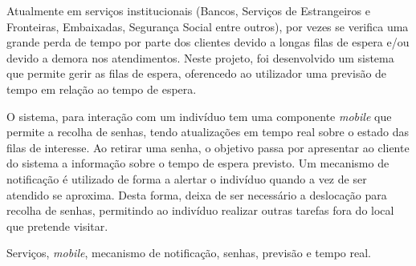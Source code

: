 \abstractPT  %

Atualmente em serviços institucionais (Bancos, Serviços de Estrangeiros e Fronteiras, Embaixadas, Segurança Social entre outros), por vezes se verifica uma grande perda de tempo por parte dos clientes devido a longas filas de espera e/ou devido a demora nos atendimentos.
Neste projeto, foi desenvolvido um sistema que permite gerir as filas de espera, oferencedo ao utilizador uma previsão de tempo em relação ao tempo de espera.

O sistema, para interação com um indivíduo tem uma componente \textit{mobile} que permite a recolha de senhas, tendo atualizações em tempo real sobre o estado das filas de interesse. Ao retirar uma senha, o objetivo passa por apresentar ao cliente do sistema a informação sobre o tempo de espera previsto. Um mecanismo de notificação é utilizado de forma a alertar o indivíduo quando a vez de ser atendido se aproxima. Desta forma, deixa de ser necessário a deslocação para recolha de senhas, permitindo ao indivíduo realizar outras tarefas fora do local que pretende visitar.

\begin{keywords}
Serviços, \textit{mobile}, mecanismo de notificação, senhas, previsão e tempo real.
\end{keywords}
